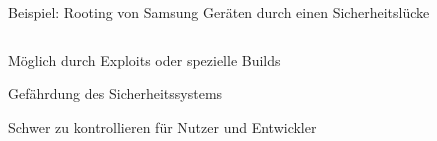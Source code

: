 \begin{frame}
	\centering
	Beispiel: Rooting von Samsung Geräten durch einen Sicherheitslücke
	\begin{columns}[T] %
    	\begin{column}[T]{5cm} %
    		\begin{block}{}
				Möglich durch Exploits oder spezielle Builds
			\end{block}
			\begin{block}{}
				Gefährdung des Sicherheitssystems
			\end{block}
			\begin{block}{}
				Schwer zu kontrollieren für Nutzer und Entwickler
			\end{block}
    	\end{column}
	\end{columns}

\end{frame}
